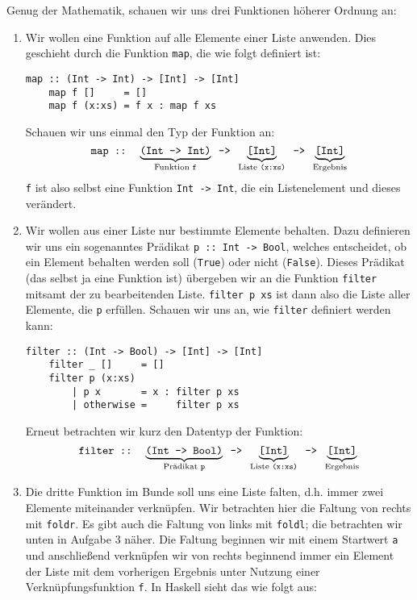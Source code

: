 \documentclass[ngerman, a4paper, 11pt]{article}
\theoremstyle{nonumberplain}
\begin{document}
Genug der Mathematik, schauen wir uns drei Funktionen höherer Ordnung an:
\begin{enumerate}[leftmargin=*]
	\item Wir wollen eine Funktion auf alle Elemente einer Liste anwenden. Dies geschieht durch die Funktion \texttt{map}, die wie folgt definiert ist:
	\begin{lstlisting}[style=frame]
	map :: (Int -> Int) -> [Int] -> [Int]
	map f []     = []
	map f (x:xs) = f x : map f xs
	\end{lstlisting}
	Schauen wir uns einmal den Typ der Funktion an:
	\begin{equation*}
		\texttt{map :: } \underbrace{\texttt{(Int -> Int)}}_{\text{Funktion \texttt{f}}} \texttt{ -> } \underbrace{\texttt{[Int]}}_{\text{Liste \texttt{(x:xs)}}} \texttt{ -> } \underbrace{\texttt{[Int]}}_{\text{Ergebnis}}
	\end{equation*}
	\texttt{f} ist also selbst eine Funktion \texttt{Int -> Int}, die ein Listenelement und dieses verändert. 
	\item Wir wollen aus einer Liste nur bestimmte Elemente behalten. Dazu definieren wir uns ein sogenanntes Prädikat \texttt{p :: Int -> Bool}, welches entscheidet, ob ein Element behalten werden soll (\texttt{True}) oder nicht (\texttt{False}). Dieses Prädikat (das selbst ja eine Funktion ist) übergeben wir an die Funktion \texttt{filter} mitsamt der zu bearbeitenden Liste. \texttt{filter p  xs} ist dann also die Liste aller Elemente, die \texttt{p} erfüllen.
	Schauen wir uns an, wie \texttt{filter} definiert werden kann:
	\begin{lstlisting}[style=frame]
	filter :: (Int -> Bool) -> [Int] -> [Int]
	filter _ []     = []
	filter p (x:xs) 
		| p x       = x : filter p xs
		| otherwise =     filter p xs
	\end{lstlisting}
	Erneut betrachten wir kurz den Datentyp der Funktion:
	\begin{equation*}
		\texttt{filter :: } \underbrace{\texttt{(Int -> Bool)}}_{\text{Prädikat \texttt{p}}} \texttt{ -> } \underbrace{\texttt{[Int]}}_{\text{Liste \texttt{(x:xs)}}} \texttt{ -> } \underbrace{\texttt{[Int]}}_{\text{Ergebnis}}
	\end{equation*}
	\item Die dritte Funktion im Bunde soll uns eine Liste falten, d.h. immer zwei Elemente miteinander verknüpfen. Wir betrachten hier die Faltung von rechts mit \texttt{foldr}. Es gibt auch die Faltung von links mit \texttt{foldl}; die betrachten wir unten in Aufgabe 3 näher. Die Faltung beginnen wir mit einem Startwert \texttt{a} und anschließend verknüpfen wir von rechts beginnend immer ein Element der Liste mit dem vorherigen Ergebnis unter Nutzung einer Verknüpfungsfunktion \texttt{f}. In Haskell sieht das wie folgt aus:

\end{enumerate}
\end{document}

